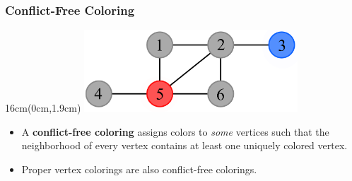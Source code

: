 \documentclass[xcolor=dvipsnames,aspectratio=1610]{beamer}
\newcommand{\exampleheight}{1.9cm}
\newcommand{\examplewidth}{16cm}
\begin{document}
  \begin{frame}
    \frametitle{Conflict-Free Coloring}

    \begin{textblock*}{\examplewidth}(0cm,\exampleheight) %
      \centering
      \includegraphics[width=8cm]{../figures/example-cfcp.pdf}
    \end{textblock*}

    \vspace{4.5cm}
    \vfill

    \begin{itemize}
      \item<1-2> A \textbf{conflict-free coloring} assigns colors to \emph{some} vertices such that the neighborhood of every vertex contains at least one uniquely colored vertex.
      \vfill
      \pause
      \item<2> Proper vertex colorings are also conflict-free colorings.
    \end{itemize}
  \end{frame}
\end{document}
